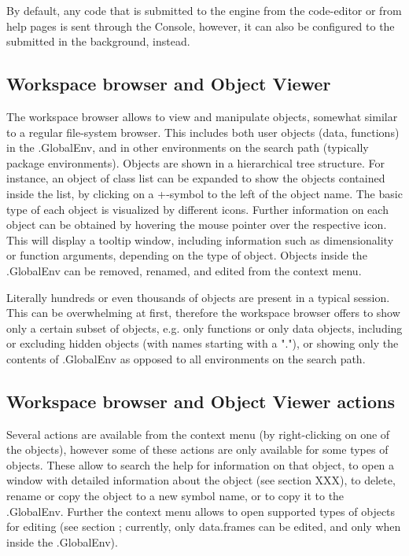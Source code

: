 By default, any code that is submitted to the
 engine from the code-editor or from help
pages is sent through the  Console,
however, it can also be configured to the submitted in the background,
instead.

\subsection{Workspace browser and Object Viewer}
\label{sec:workspace_browser_object_viewer}

The workspace browser allows to view
and manipulate  objects, somewhat similar
to a regular file-system browser. This includes both user objects
(data, functions) in the .GlobalEnv, and in other environments on the
 search path (typically
 package environments). Objects are shown
in a hierarchical tree structure. For instance, an object of class
list can be expanded to show the objects
contained inside the list, by clicking on a
+-symbol to the left of the object name.
The basic type of each object is visualized by different icons. Further
information on each object can be obtained by hovering the mouse
pointer over the respective icon. This will display a tooltip window,
including information such as dimensionality or function arguments,
depending on the type of object. Objects inside the .GlobalEnv can be
removed, renamed, and edited from the context menu.

Literally hundreds or even thousands of objects are present in a typical
 session. This can be overwhelming at
first, therefore the workspace browser offers to show only a certain
subset of objects, e.g. only functions or only data objects, including
or excluding hidden objects (with names
starting with a "."), or showing only the contents of .GlobalEnv as
opposed to all environments on the search path.

\subsection{Workspace browser and Object Viewer actions}
\label{sec:workspace_browser_object_viewer_actions}

Several actions are available from the context menu (by right-clicking
on one of the objects), however some of these actions are only
available for some types of objects. These allow to search the
 help for information on that object, to
open a window with detailed information about the object (see section
XXX), to delete, rename or copy the object to a new symbol name, or to
copy it to the .GlobalEnv. Further the context menu allows to open
supported types of objects for editing (see section ; currently, only
data.frames can be edited, and only when inside the .GlobalEnv). 

